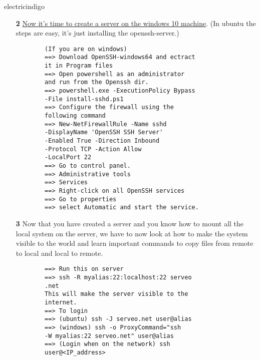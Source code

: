 \documentclass[12pt]{article}
\begin{document}
\begin{mybox}{electricindigo}{}
	\begin{itemize}
		\item[\textbf{2}] \href{https://winscp.net/eng/docs/guide_windows_openssh_server}{Now it's time to create a server on the windows 10 machine}. (In ubuntu the steps are easy, it's just installing the openssh-server.)
		\begin{lstlisting}
		(If you are on windows)
		==> Download OpenSSH-windows64 and ectract 
		it in Program files
		==> Open powershell as an administrator
		and run from the Openssh dir.
		==> powershell.exe -ExecutionPolicy Bypass
		-File install-sshd.ps1
		==> Configure the firewall using the
		following command
		==> New-NetFirewallRule -Name sshd 
		-DisplayName 'OpenSSH SSH Server' 
		-Enabled True -Direction Inbound 
		-Protocol TCP -Action Allow 
		-LocalPort 22
		==> Go to control panel.
		==> Administrative tools
		==> Services
		==> Right-click on all OpenSSH services
		==> Go to properties
		==> select Automatic and start the service.
		\end{lstlisting}  
		
		\item[\textbf{3}]Now that you have created a server and you know how to mount all the local system on the server, we have to now look at how to make the system visible to the world and learn important commands to copy files from remote to local and local to remote.
		\begin{lstlisting}
		==> Run this on server
		==> ssh -R myalias:22:localhost:22 serveo
		.net
		This will make the server visible to the 
		internet.
		==> To login
		==> (ubuntu) ssh -J serveo.net user@alias
		==> (windows) ssh -o ProxyCommand="ssh 
		-W myalias:22 serveo.net" user@alias
		==> (Login when on the network) ssh 
		user@<IP_address>
		\end{lstlisting} 
	\end{itemize}
\end{mybox}
	
\end{document}
